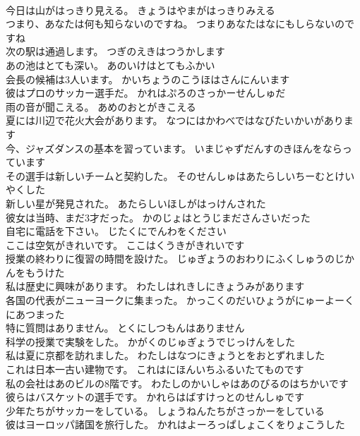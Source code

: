\documentclass[8pt]{extreport}
\begin{document}
\begin{CJK}{UTF8}{min}
\\	今日は山がはっきり見える。	きょうはやまがはっきりみえる 
\\	つまり、あなたは何も知らないのですね。	つまりあなたはなにもしらないのですね 
\\	次の駅は通過します。	つぎのえきはつうかします 
\\	あの池はとても深い。	あのいけはとてもふかい 
\\	会長の候補は3人います。	かいちょうのこうほはさんにんいます 
\\	彼はプロのサッカー選手だ。	かれはぷろのさっかーせんしゅだ 
\\	雨の音が聞こえる。	あめのおとがきこえる 
\\	夏には川辺で花火大会があります。	なつにはかわべではなびたいかいがあります 
\\	今、ジャズダンスの基本を習っています。	いまじゃずだんすのきほんをならっています 
\\	その選手は新しいチームと契約した。	そのせんしゅはあたらしいちーむとけいやくした 
\\	新しい星が発見された。	あたらしいほしがはっけんされた 
\\	彼女は当時、まだ3才だった。	かのじょはとうじまださんさいだった 
\\	自宅に電話を下さい。	じたくにでんわをください 
\\	ここは空気がきれいです。	ここはくうきがきれいです 
\\	授業の終わりに復習の時間を設けた。	じゅぎょうのおわりにふくしゅうのじかんをもうけた 
\\	私は歴史に興味があります。	わたしはれきしにきょうみがあります 
\\	各国の代表がニューヨークに集まった。	かっこくのだいひょうがにゅーよーくにあつまった 
\\	特に質問はありません。	とくにしつもんはありません 
\\	科学の授業で実験をした。	かがくのじゅぎょうでじっけんをした 
\\	私は夏に京都を訪れました。	わたしはなつにきょうとをおとずれました 
\\	これは日本一古い建物です。	これはにほんいちふるいたてものです 
\\	私の会社はあのビルの8階です。	わたしのかいしゃはあのびるのはちかいです 
\\	彼らはバスケットの選手です。	かれらはばすけっとのせんしゅです 
\\	少年たちがサッカーをしている。	しょうねんたちがさっかーをしている 
\\	彼はヨーロッパ諸国を旅行した。	かれはよーろっぱしょこくをりょこうした 

\end{CJK}
\end{document}
